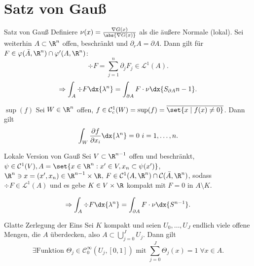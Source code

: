 \section*{Satz von Gauß}

\begin{karte}{Satz von Gauß}
    Definiere \( \nu(x) = \frac{\nabla G(x)}{\abs{\nabla G(x)}} \) als die 
    äußere Normale (lokal). Sei weiterhin \( A \subset \R^n \) offen, beschränkt und 
    \( \partial_r A = \partial A \). Dann gilt für \(F \in \varphi(\bar{A}, \R^n) \cap \varphi'(A, \R^n)\):
    \[ \div F = \sum_{j=1}^n \partial_j F_j \in \mathcal{L}^1(A). \]
    \[ \Rightarrow \int_A \div F \dx{\lambda^n} = \int_{\partial A} F \cdot \nu \dx{S_{\partial A}{n-1}}. \]
\end{karte}

\begin{karte}{\( \sup(f) \)}
    Sei \( W\in \R^n \) offen, \(f \in \mathcal{C}_c^1(W) = \sup(f) = \overline{\set{x\;|\;f(x) \neq 0}} \). Dann gilt 
    \[ \int_W \frac{\partial f}{\partial x_i} \dx{\lambda^n} = 0 \ i=1,\ldots, n. \]
\end{karte}

\begin{karte}{Lokale Version von Gauß}
    Sei \(V \subset \R^{n-1}\) offen und beschränkt, 
    \( \psi \in \mathcal{C}^1(V), A = \set{x\in \R^n : x'\in V, x_n \subset \psi(x') } \), 
    \(\R^n \ni x = (x', x_n) \in \R^{n-1}\times \R \), 
    \( F \in \mathcal{C}^1(A, \R^n) \cap \mathcal{C}(\bar{A}, \R^n) \), sodass 
    \( \div F \in \mathcal{L}^1(A) \) und es gebe \(K \in V \times \R\) kompakt mit 
    \(F = 0\) in \(A \setminus K\).

    \[ \Rightarrow \int_A \div F \dx{\lambda^n} = \int_{\partial A} F \cdot \nu \dx{S^{n-1}}. \]
\end{karte}

\begin{karte}{Glatte Zerlegung der Eins}
    Sei \(K\) kompakt und seien \( U_0,\ldots, U_J \) endlich viele offene Mengen, 
    die \(A\) überdecken, also \( A \subset \bigcup_{j=0}^J U_j \). Dann gilt 
    \[ \exists \text{Funktion } \Theta_j \in \mathcal{C}^\infty_0(U_j, [0,1]) \text{ mit } \sum_{j=0}^J \Theta_j(x) = 1 \;\forall x\in A. \]
\end{karte}